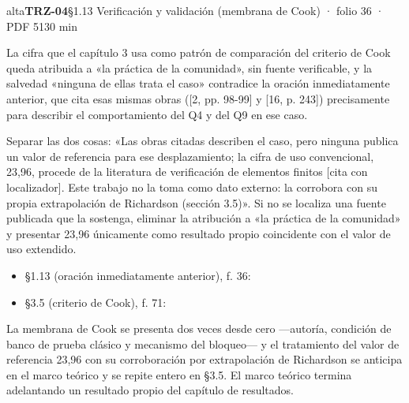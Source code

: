 \begin{ficha}{alta}{\casilla\textbf{TRZ-04}\quad{}\quad §1.13 Verificación y validación (membrana de Cook) · folio 36 · PDF 51\hfill 30 min}
\par
{}La cifra que el capítulo 3 usa como patrón de comparación del criterio de Cook queda atribuida a «la práctica de la comunidad», sin fuente verificable, y la salvedad «ninguna de ellas trata el caso» contradice la oración inmediatamente anterior, que cita esas mismas obras ([2, pp. 98-99]\allowbreak{} y [16, p. 243]\allowbreak{}) precisamente para describir el comportamiento del Q4 y del Q9 en ese caso.\par
{}Separar las dos cosas: «Las obras citadas describen el caso, pero ninguna publica un valor de referencia para ese desplazamiento; la cifra de uso convencional, 23,96, procede de la literatura de verificación de elementos finitos [cita con localizador]\allowbreak{}. Este trabajo no la toma como dato externo: la corrobora con su propia extrapolación de Richardson (sección 3.5)». Si no se localiza una fuente publicada que la sostenga, eliminar la atribución a «la práctica de la comunidad» y presentar 23,96 únicamente como resultado propio coincidente con el valor de uso extendido.\par
{}\begin{itemize}[leftmargin=1.2em,itemsep=1pt,topsep=1pt]
\item {\small §1.13 (oración inmediatamente anterior), f. 36: }
\item {\small §3.5 (criterio de Cook), f. 71: }
\end{itemize}
{\small\color{gris}La membrana de Cook se presenta dos veces desde cero —autoría, condición de banco de prueba clásico y mecanismo del bloqueo— y el tratamiento del valor de referencia 23,96 con su corroboración por extrapolación de Richardson se anticipa en el marco teórico y se repite entero en §3.5. El marco teórico termina adelantando un resultado propio del capítulo de resultados.\par}
\end{ficha}
